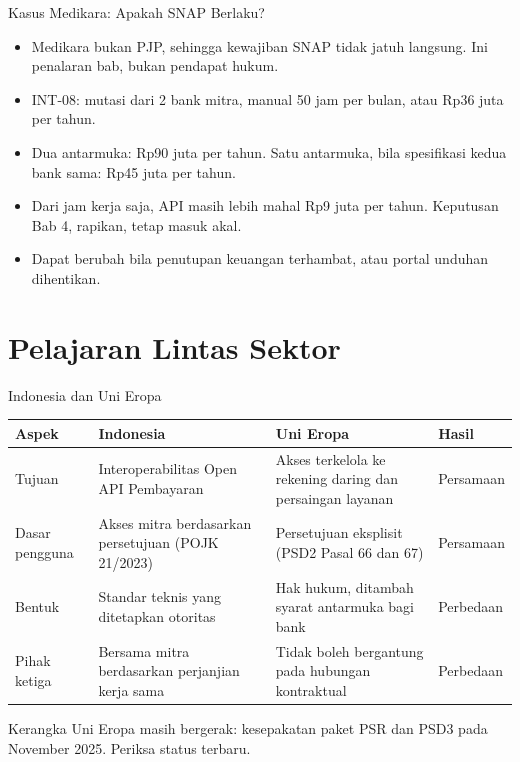 \documentclass[aspectratio=169, table, 12pt]{beamer}
\begin{document}
\begin{frame}{{\Large Kasus Medikara: Apakah SNAP Berlaku?}}
  \vspace{8pt}
  \begin{itemize}
    \item Medikara bukan PJP, sehingga kewajiban SNAP tidak jatuh langsung. Ini penalaran bab, bukan pendapat hukum.
    \item INT-08: mutasi dari 2 bank mitra, manual 50 jam per bulan, atau Rp36 juta per tahun.
    \item Dua antarmuka: Rp90 juta per tahun. Satu antarmuka, bila spesifikasi kedua bank sama: Rp45 juta per tahun.
    \item Dari jam kerja saja, API masih lebih mahal Rp9 juta per tahun. Keputusan Bab 4, rapikan, tetap masuk akal.
    \item Dapat berubah bila penutupan keuangan terhambat, atau portal unduhan dihentikan.
  \end{itemize}
\end{frame}

\section{Pelajaran Lintas Sektor}

\begin{frame}{{\Large Indonesia dan Uni Eropa}}
  \footnotesize
  \begin{tabularx}{\textwidth}{>{\raggedright\arraybackslash}p{2.2cm}
      >{\raggedright\arraybackslash}X >{\raggedright\arraybackslash}X >{\raggedright\arraybackslash}p{1.9cm}}
    \hline
    \textbf{Aspek} & \textbf{Indonesia} & \textbf{Uni Eropa} & \textbf{Hasil} \\ \hline
    Tujuan & Interoperabilitas Open API Pembayaran & Akses terkelola ke rekening daring dan persaingan layanan & Persamaan \\ \hline
    Dasar pengguna & Akses mitra berdasarkan persetujuan (POJK 21/2023) & Persetujuan eksplisit (PSD2 Pasal 66 dan 67) & Persamaan \\ \hline
    Bentuk & Standar teknis yang ditetapkan otoritas & Hak hukum, ditambah syarat antarmuka bagi bank & Perbedaan \\ \hline
    Pihak ketiga & Bersama mitra berdasarkan perjanjian kerja sama & Tidak boleh bergantung pada hubungan kontraktual & Perbedaan \\ \hline
  \end{tabularx}

  \vspace{6pt}
  {\small Kerangka Uni Eropa masih bergerak: kesepakatan paket PSR dan PSD3 pada November 2025. Periksa status terbaru.}
\end{frame}
\end{document}
